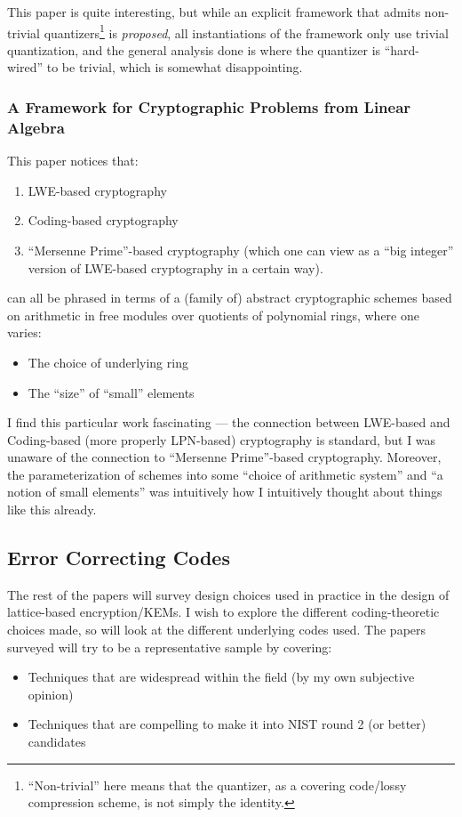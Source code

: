 \documentclass{article}
\begin{document}
This paper is quite interesting, but while an explicit framework that admits non-trivial quantizers\footnote{``Non-trivial'' here means that the quantizer, as a covering code/lossy compression scheme, is not simply the identity.} is \emph{proposed}, all instantiations of the framework only use trivial quantization, and the general analysis done is where the quantizer is ``hard-wired'' to be trivial, which is somewhat disappointing.


\subsubsection{A Framework for Cryptographic Problems from Linear Algebra}

This paper notices that:
\begin{enumerate}
	\item LWE-based cryptography
	\item Coding-based cryptography
	\item ``Mersenne Prime''-based cryptography (which one can view as a ``big integer'' version of LWE-based cryptography in a certain way).
\end{enumerate}
can all be phrased in terms of a (family of) abstract cryptographic schemes based on arithmetic in free modules over quotients of polynomial rings, where one varies:
\begin{itemize}
	\item The choice of underlying ring
	\item The ``size'' of ``small'' elements
\end{itemize}
I find this particular work fascinating --- the connection between LWE-based and Coding-based (more properly LPN-based) cryptography is standard, but I was unaware of the connection to ``Mersenne Prime''-based cryptography.
Moreover, the parameterization of schemes into some ``choice of arithmetic system'' and ``a notion of small elements'' was intuitively how I intuitively thought about things like this already.

\subsection{Error Correcting Codes}
The rest of the papers will survey design choices used in practice in the design of lattice-based encryption/KEMs.
I wish to explore the different coding-theoretic choices made, so will look at the different underlying codes used.
The papers surveyed will try to be a representative sample by covering:
\begin{itemize}
	\item Techniques that are widespread within the field (by my own subjective opinion)
	\item Techniques that are compelling to make it into NIST round 2 (or better) candidates
\end{itemize}
\end{document}
